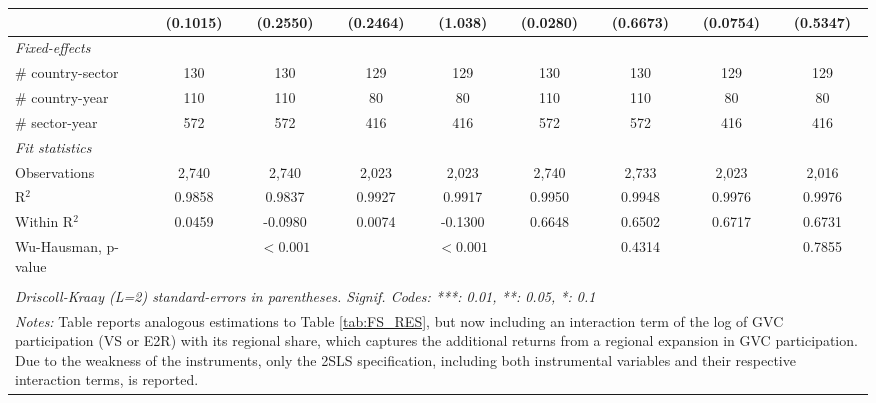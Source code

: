 \documentclass[a4paper]{article}
\begin{document}
\begin{table}[h!]
{\begin{tabular}{lcccccccc}
                                                     & (0.1015)       & (0.2550)               & (0.2464)     & (1.038)                 & (0.0280)       & (0.6673)       & (0.0754)       & (0.5347)  \\                                                           
      \midrule
      \emph{Fixed-effects}\\
      \# country-sector                              & 130            & 130                    & 129          & 129                     & 130            & 130            & 129            & 129\\  
      \# country-year                                & 110            & 110                    & 80           & 80                      & 110            & 110            & 80             & 80\\  
      \# sector-year                                 & 572            & 572                    & 416          & 416                     & 572            & 572            & 416            & 416\\
            \midrule
      \emph{Fit statistics}\\
      Observations                                   & 2,740          & 2,740                  & 2,023        & 2,023                   & 2,740          & 2,733          & 2,023          & 2,016\\  
      R$^2$                                          & 0.9858         & 0.9837                 & 0.9927       & 0.9917                  & 0.9950         & 0.9948         & 0.9976         & 0.9976\\  
      Within R$^2$                                   & 0.0459         & -0.0980                & 0.0074       & -0.1300                 & 0.6648         & 0.6502         & 0.6717         & 0.6731\\  
      Wu-Hausman, p-value                            &                & $<0.001$  &              & $<0.001$    &                                         & 0.4314         &                & 0.7855\\ 
      \bottomrule \\ [-0.9em]
      \multicolumn{9}{l}{\emph{Driscoll-Kraay (L=2) standard-errors in parentheses. Signif. Codes: ***: 0.01, **: 0.05, *: 0.1}}\\
     \multicolumn{9}{l}{\parbox{1.19\textwidth}{\scriptsize
\textit{Notes:} Table reports analogous estimations to Table \ref{tab:FS_RES}, but now including an interaction term of the log of GVC participation (VS or E2R) with its regional share, which captures the additional returns from a regional expansion in GVC participation. Due to the weakness of the instruments, only the 2SLS specification, including both instrumental variables and their respective interaction terms, is reported. }}
   \end{tabular}
   }
\end{table}
\FloatBarrier
\end{document}
